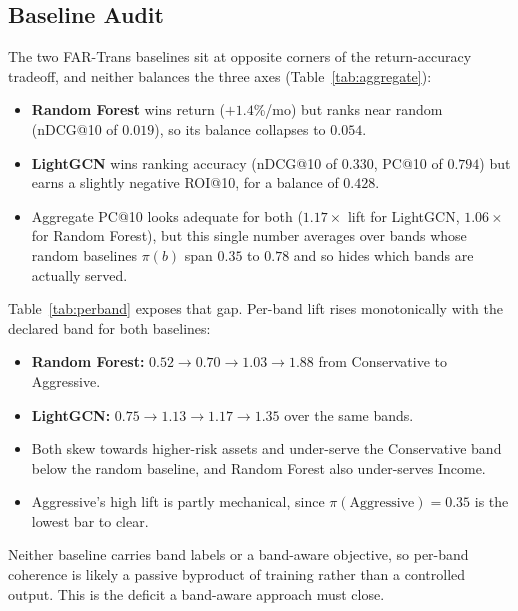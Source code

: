 \subsection{Baseline Audit}
\label{sec:results:baseline}
The two FAR-Trans baselines sit at opposite corners of the return-accuracy tradeoff, and neither balances the three axes (Table~\ref{tab:aggregate}):
\begin{itemize}
    \item \textbf{Random Forest} wins return ($+1.4$\%/mo) but ranks near random (nDCG@10 of $0.019$), so its balance collapses to $0.054$.
    \item \textbf{LightGCN} wins ranking accuracy (nDCG@10 of $0.330$, PC@10 of $0.794$) but earns a slightly negative ROI@10, for a balance of $0.428$.
    \item Aggregate PC@10 looks adequate for both ($1.17\times$ lift for LightGCN, $1.06\times$ for Random Forest), but this single number averages over bands whose random baselines $\pi(b)$ span $0.35$ to $0.78$ and so hides which bands are actually served.
\end{itemize}

Table~\ref{tab:perband} exposes that gap. Per-band lift rises monotonically with the declared band for both baselines:
\begin{itemize}
    \item \textbf{Random Forest:} $0.52 \to 0.70 \to 1.03 \to 1.88$ from Conservative to Aggressive.
    \item \textbf{LightGCN:} $0.75 \to 1.13 \to 1.17 \to 1.35$ over the same bands.
    \item Both skew towards higher-risk assets and under-serve the Conservative band below the random baseline, and Random Forest also under-serves Income.
    \item Aggressive's high lift is partly mechanical, since $\pi(\text{Aggressive}) = 0.35$ is the lowest bar to clear.
\end{itemize}

Neither baseline carries band labels or a band-aware objective, so per-band coherence is likely a passive byproduct of training rather than a controlled output. This is the deficit a band-aware approach must close.


